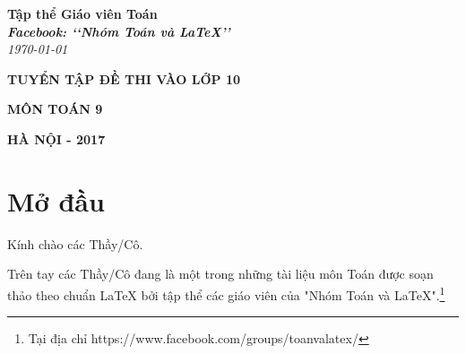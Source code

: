 \documentclass[12pt,a4paper,oneside]{book}
\renewcommand{\baselinestretch}{1.4}
\begin{document}
\providecommand*{\dx}{\ensuremath{\mathrm{\,d}}x}
\providecommand*{\unit}[1]{\ensuremath{\mathrm{\,#1}}}

\begin{titlepage}
\begin{flushright}
\fontsize{17}{0}\selectfont
\textbf{Tập thể Giáo viên Toán}\\
\textbf{\textit{Facebook: \lq\lq Nhóm Toán và LaTeX\rq\rq}}\\
\textit{\color{red}\today}
\end{flushright}

\vspace{4cm}

\begin{flushright}

\vspace{1cm}

 \textbf{\fontsize{30}{0}\selectfont T\fontsize{20}{0}\selectfont UYỂN TẬP ĐỀ THI VÀO LỚP 10}
 
 \vspace{1cm}
 
 \textbf{\fontsize{35}{0}\selectfont MÔN TOÁN 9}
\end{flushright}

\vfill{
\begin{flushright}
\fontsize{17}{0}\textbf{HÀ NỘI - 2017}
\end{flushright}
}
\end{titlepage}
\pagestyle{empty}
\renewcommand{\headrulewidth}{0.4pt}

{\renewcommand{\baselinestretch}{1.3}
\tableofcontents
}

\pagestyle{fancy}
\lhead{\empty}
\rhead{\empty}
\lfoot{\currfilename}
\chapter*{Mở đầu}
Kính chào các Thầy/Cô.

\vspace{0.6cm}

\noindent Trên tay các Thầy/Cô đang là một trong những tài liệu môn Toán được soạn thảo theo chuẩn \LaTeX{} bởi tập thể các giáo viên của "Nhóm Toán và LaTeX".\footnote{Tại địa chỉ https://www.facebook.com/groups/toanvalatex/}

\vspace{0.6cm}
\end{document}
